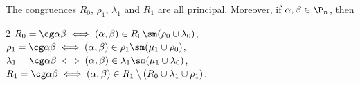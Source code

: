 \begin{proposition}\label{prop:joins2}
The congruences $R_0$, $\rho_1$, $\lambda_1$ and $R_1$ are all principal.  Moreover, if $\alpha,\beta\in\P_n$, then
\begin{itemize}\begin{multicols}2
 $R_0=\cg\alpha\beta\iff(\alpha,\beta)\in R_0 \sm(\rho_0\cup\lambda_0)$,
 $\rho_1=\cg\alpha\beta\iff(\alpha,\beta)\in\rho_1\sm(\mu_1\cup\rho_0)$,
 $\lambda_1=\cg\alpha\beta\iff(\alpha,\beta)\in\lambda_1\sm(\mu_1\cup\lambda_0)$,
 $R_1=\cg\alpha\beta\iff(\alpha,\beta)\in R_1\setminus ( R_0 \cup \lambda_1 \cup \rho_1 )$.
\end{multicols}\end{itemize}
\end{proposition}

